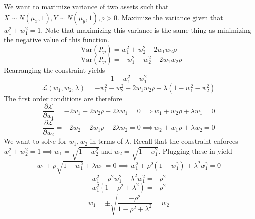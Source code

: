 \documentclass[12pt]{scrartcl}
\newcommand{\Var}{\text{Var}}
\begin{document}
\begin{example}
  We want to maximize variance of two assets such that $X \sim N(\mu_x, 1), Y \sim N(\mu_y, 1), \rho > 0$. 
  Maximize the variance given that $w_1^2 + w_1^2 = 1$. Note that maximizing this variance 
  is the same thing as minimizing the negative value of this function.
  \[\Var(R_p) = w_1^2 + w_2^2 + 2w_1w_2\rho\]
  \[-\Var(R_p) = -w_1^2 -  w_2^2 - 2w_1w_2\rho\]
  Rearranging the constraint yields 
  \[1 - w_1^2 - w_1^2\]
  \[\mathcal{L}(w_1, w_2, \lambda) = -w_1^2 -w_2^2 -2w_1w_2\rho + \lambda(1 - w_1^2 - w_2^2)\]
  The first order conditions are therefore
  \[\frac{\partial \mathcal{L}}{\partial w_1} = -2w_1 - 2w_2\rho -2\lambda w_1 = 0 \implies w_1 + w_2\rho + \lambda w_1 = 0\] 
  \[\frac{\partial \mathcal{L}}{\partial w_2} = -2w_2  - 2w_1\rho - 2\lambda w_2 = 0 \implies w_2 + w_1\rho + \lambda w_2 = 0\]
  We want to solve for $w_1, w_2$ in terms of $\lambda$. Recall that the constraint enforces 
  $w_1^2 + w_2^2 = 1 \implies w_1 = \sqrt{1 - w_2^2}$ and $w_2 = \sqrt{1 - w_1^2}$.
  Plugging these in yield
  \[w_1 + \rho\sqrt{1-w_1^2} + \lambda w_1 = 0 \implies w_1^2 + \rho^2(1-w_1^2) + \lambda^2 w_1^2 = 0\]
  \[w_1^2 - \rho^2 w_1^2 + \lambda^2 w_1^2 = -\rho^2\]
  \[w_1^2(1 - \rho^2 + \lambda^2) = -\rho^2\]
  \[w_1 = \pm \sqrt{\frac{-\rho^2}{1 - \rho^2 + \lambda^2}} = w_2\]
\end{example}
\end{document}
